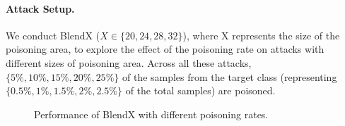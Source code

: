 \documentclass{article}
\begin{document}
\paragraph{Attack Setup.}
We conduct BlendX (\(X\in\{20,24,28,32\}\)), where X represents the size of the poisoning area, to explore the effect of the poisoning rate on attacks with different sizes of poisoning area.  Across all these attacks, \(\{5\%,10\%,15\%,20\%,25\%\}\) of the samples from the target class (representing \(\{0.5\%,1\%,1.5\%,2\%,2.5\%\}\) of the total samples) are poisoned.
\begin{figure}[h]
\setlength{\itemsep}{-10pt}
\centering
{}
\caption{Performance of BlendX with different poisoning rates.} 
\end{figure}
\end{document}
